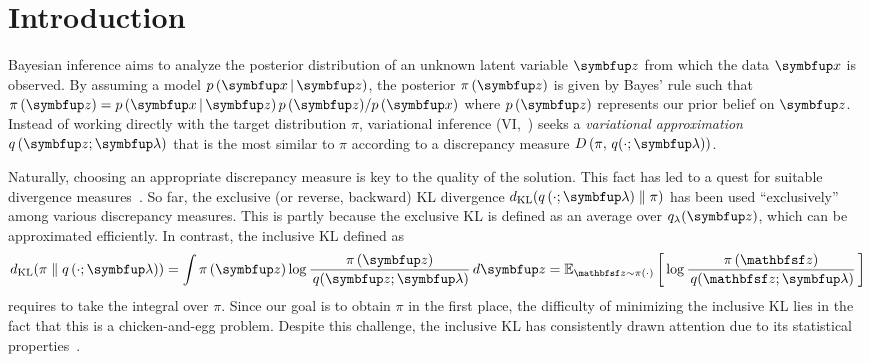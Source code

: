 
\section{Introduction}\label{section:intro}
Bayesian inference aims to analyze the posterior distribution of an unknown latent variable \(\vz\) from which the data \(\vx\) is observed.
By assuming a model \(p\,(\vx\,|\,\vz)\), the posterior \(\pi\,(\vz)\) is given by Bayes' rule such that \(\pi\,(\vz) = {p\,(\vx\,|\,\vz)\,p\,(\vz)}/{p\,(\vx)}\) where \(p\,(\vz)\) represents our prior belief on \(\vz\).
Instead of working directly with the target distribution \(\pi\), variational inference (VI,~\citealt{blei_variational_2017}) seeks a \textit{variational approximation} \(q\,(\vz; \vlambda)\) that is the most similar to \(\pi\) according to a discrepancy measure \(D\,(\pi,\, q(\cdot; \vlambda))\).

Naturally, choosing an appropriate discrepancy measure is key to the quality of the solution.
This fact has led to a quest for suitable divergence measures~\citep{pmlr-v37-salimans15, NIPS2016_7750ca35, NIPS2017_35464c84, NEURIPS2018_1cd138d0, pmlr-v97-ruiz19a}.
So far, the exclusive (or reverse, backward)  KL divergence \(\DKL{q\left(\cdot; \vlambda\right)}{\pi}\) has been used ``exclusively'' among various discrepancy measures.
This is partly because the exclusive KL is defined as an average over \(q_{\lambda}(\vz)\), which can be approximated efficiently.
In contrast, the inclusive KL defined as
%
{%
\vspace{-0.05in}
\begin{align*}
  \DKL{\pi}{q\left(\cdot; \vlambda\right)}
  = \int \pi\,(\vz) \log \frac{\pi\left(\vz\right)}{\,q(\vz; \vlambda)} \,d\vz
  = \Esub{\rvvz \sim \pi\left(\cdot\right)}{\log \frac{\pi\left(\rvvz\right)}{\,q(\rvvz; \vlambda)} } %
\end{align*}
}%
%
requires to take the integral over \(\pi\).
Since our goal is to obtain \(\pi\) in the first place, the difficulty of minimizing the inclusive KL lies in the fact that this is a chicken-and-egg problem.
Despite this challenge, the inclusive KL has consistently drawn attention due to its statistical properties~\citep{minka2005divergence, mackay_local_2001}.

